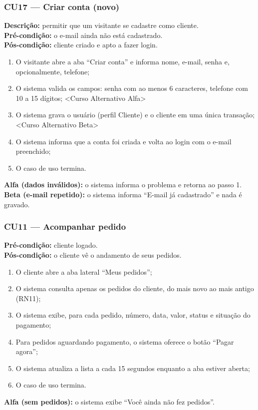 \documentclass[12pt]{article}
\begin{document}
\subsubsection{CU17 --- Criar conta (novo)}
\textbf{Descrição:} permitir que um visitante se cadastre como cliente.\\
\textbf{Pré-condição:} o e-mail ainda não está cadastrado.\\
\textbf{Pós-condição:} cliente criado e apto a fazer login.
\begin{enumerate}[nosep]
\item O visitante abre a aba ``Criar conta'' e informa nome, e-mail, senha e, opcionalmente, telefone;
\item O sistema valida os campos: senha com ao menos 6 caracteres, telefone com 10 a 15 dígitos; <Curso Alternativo Alfa>
\item O sistema grava o usuário (perfil Cliente) e o cliente em uma única transação; <Curso Alternativo Beta>
\item O sistema informa que a conta foi criada e volta ao login com o e-mail preenchido;
\item O caso de uso termina.
\end{enumerate}
\textbf{Alfa (dados inválidos):} o sistema informa o problema e retorna ao passo 1.\\
\textbf{Beta (e-mail repetido):} o sistema informa ``E-mail já cadastrado'' e nada é gravado.

\subsubsection{CU11 --- Acompanhar pedido}
\textbf{Pré-condição:} cliente logado.\\
\textbf{Pós-condição:} o cliente vê o andamento de seus pedidos.
\begin{enumerate}[nosep]
\item O cliente abre a aba lateral ``Meus pedidos'';
\item O sistema consulta apenas os pedidos do cliente, do mais novo ao mais antigo (RN11);
\item O sistema exibe, para cada pedido, número, data, valor, status e situação do pagamento;
\item Para pedidos aguardando pagamento, o sistema oferece o botão ``Pagar agora'';
\item O sistema atualiza a lista a cada 15 segundos enquanto a aba estiver aberta;
\item O caso de uso termina.
\end{enumerate}
\textbf{Alfa (sem pedidos):} o sistema exibe ``Você ainda não fez pedidos''.
\end{document}
